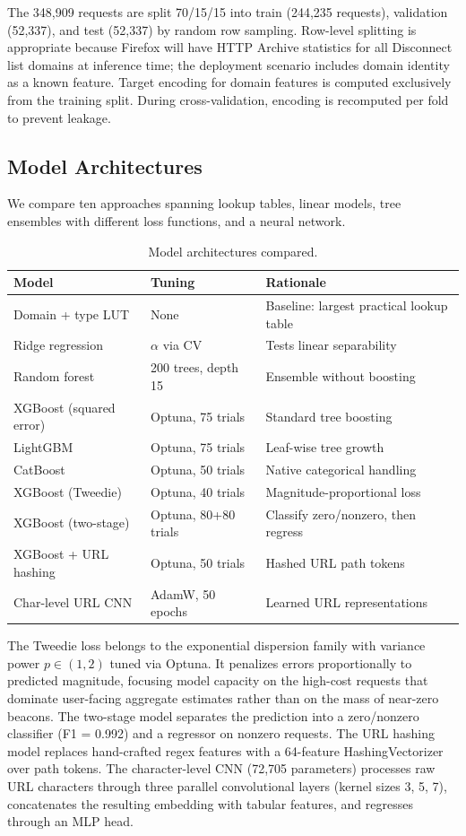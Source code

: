 \documentclass[11pt]{article}
\begin{document}
The 348,909 requests are split 70/15/15 into train (244,235 requests), validation (52,337), and test (52,337) by random row sampling. Row-level splitting is appropriate because Firefox will have HTTP Archive statistics for all Disconnect list domains at inference time; the deployment scenario includes domain identity as a known feature. Target encoding for domain features is computed exclusively from the training split. During cross-validation, encoding is recomputed per fold to prevent leakage.

\subsection{Model Architectures}

We compare ten approaches spanning lookup tables, linear models, tree ensembles with different loss functions, and a neural network.

\begin{table}[h]
\centering
\small
\begin{tabular}{llp{5.5cm}}
\toprule
Model & Tuning & Rationale \\
\midrule
Domain + type LUT & None & Baseline: largest practical lookup table \\
Ridge regression & $\alpha$ via CV & Tests linear separability \\
Random forest & 200 trees, depth 15 & Ensemble without boosting \\
XGBoost (squared error) & Optuna, 75 trials & Standard tree boosting \\
LightGBM & Optuna, 75 trials & Leaf-wise tree growth \\
CatBoost & Optuna, 50 trials & Native categorical handling \\
XGBoost (Tweedie) & Optuna, 40 trials & Magnitude-proportional loss \\
XGBoost (two-stage) & Optuna, 80+80 trials & Classify zero/nonzero, then regress \\
XGBoost + URL hashing & Optuna, 50 trials & Hashed URL path tokens \\
Char-level URL CNN & AdamW, 50 epochs & Learned URL representations \\
\bottomrule
\end{tabular}
\caption{Model architectures compared.}
\label{tab:models}
\end{table}

The Tweedie loss belongs to the exponential dispersion family with variance power $p \in (1, 2)$ tuned via Optuna. It penalizes errors proportionally to predicted magnitude, focusing model capacity on the high-cost requests that dominate user-facing aggregate estimates rather than on the mass of near-zero beacons. The two-stage model separates the prediction into a zero/nonzero classifier (F1 = 0.992) and a regressor on nonzero requests. The URL hashing model replaces hand-crafted regex features with a 64-feature HashingVectorizer over path tokens. The character-level CNN (72,705 parameters) processes raw URL characters through three parallel convolutional layers (kernel sizes 3, 5, 7), concatenates the resulting embedding with tabular features, and regresses through an MLP head.
\end{document}
